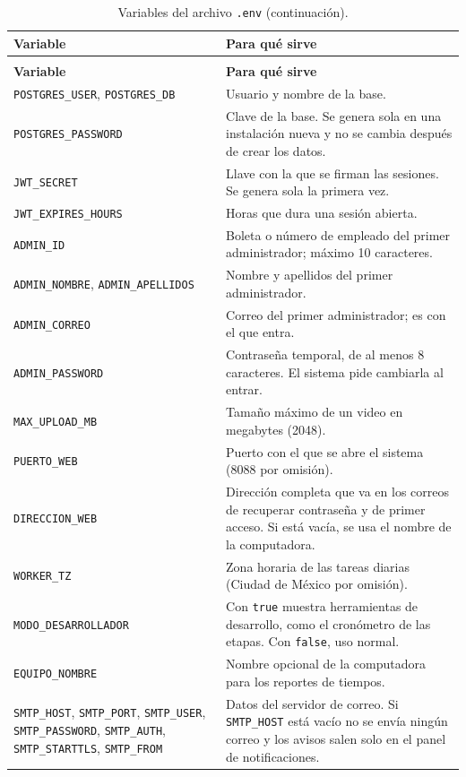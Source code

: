 \begin{longtable}{|p{4.0cm}|p{9.8cm}|}
\caption{Variables del archivo \texttt{.env}.}
\label{tab:ap_variables}\\
\hline
\textbf{Variable} & \textbf{Para qué sirve} \\
\hline
\endfirsthead
\caption[]{Variables del archivo \texttt{.env} (continuación).}\\
\hline
\textbf{Variable} & \textbf{Para qué sirve} \\
\hline
\endhead
\texttt{POSTGRES\_USER}, \texttt{POSTGRES\_DB} & Usuario y nombre de la base. \\
\hline
\texttt{POSTGRES\_PASSWORD} & Clave de la base. Se genera sola en una instalación
nueva y no se cambia después de crear los datos. \\
\hline
\texttt{JWT\_SECRET} & Llave con la que se firman las sesiones. Se genera sola la
primera vez. \\
\hline
\texttt{JWT\_EXPIRES\_HOURS} & Horas que dura una sesión abierta. \\
\hline
\texttt{ADMIN\_ID} & Boleta o número de empleado del primer administrador; máximo 10
caracteres. \\
\hline
\texttt{ADMIN\_NOMBRE}, \texttt{ADMIN\_APELLIDOS} & Nombre y apellidos del primer
administrador. \\
\hline
\texttt{ADMIN\_CORREO} & Correo del primer administrador; es con el que entra. \\
\hline
\texttt{ADMIN\_PASSWORD} & Contraseña temporal, de al menos 8 caracteres. El sistema
pide cambiarla al entrar. \\
\hline
\texttt{MAX\_UPLOAD\_MB} & Tamaño máximo de un video en megabytes (2048). \\
\hline
\texttt{PUERTO\_WEB} & Puerto con el que se abre el sistema (8088 por omisión). \\
\hline
\texttt{DIRECCION\_WEB} & Dirección completa que va en los correos de recuperar
contraseña y de primer acceso. Si está vacía, se usa el nombre de la computadora. \\
\hline
\texttt{WORKER\_TZ} & Zona horaria de las tareas diarias (Ciudad de México por
omisión). \\
\hline
\texttt{MODO\_DESARROLLADOR} & Con \texttt{true} muestra herramientas de desarrollo,
como el cronómetro de las etapas. Con \texttt{false}, uso normal. \\
\hline
\texttt{EQUIPO\_NOMBRE} & Nombre opcional de la computadora para los reportes de
tiempos. \\
\hline
\texttt{SMTP\_HOST}, \texttt{SMTP\_PORT}, \texttt{SMTP\_USER}, \texttt{SMTP\_PASSWORD},
\texttt{SMTP\_AUTH}, \texttt{SMTP\_STARTTLS}, \texttt{SMTP\_FROM} & Datos del servidor
de correo. Si \texttt{SMTP\_HOST} está vacío no se envía ningún correo y los avisos
salen solo en el panel de notificaciones. \\
\hline
\end{longtable}


